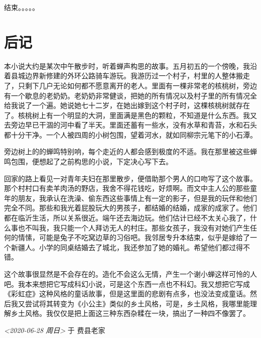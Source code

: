 \documentclass[lang=cn]{elegantpaper}
\begin{document}
结束。。。。。


\section{后记}
\label{sec:orgeed4a2e}

本小说大约是某次中午散步时，听着蝉声构思的故事。五月初五的一个傍晚，我沿着县城边界新修建的外环公路骑车游玩。我游历过一个村子，村里的人整体搬走了，只剩下几户无论如何都不愿意离开的老人。里面有一棵非常老的核桃树，旁边有一个歇息的老奶奶。老奶奶非常健谈，把她的所有情况以及村子里的所有情况全给我说了一个遍。她说她七十二岁，在她出嫁到这个村子时，这棵核桃树就存在了。核桃树上有一个明显的大洞，里面满是黑色的颗粒，不知道是什么东西。我又去旁边早已干涸的河中看了半天。里面还蓄有一些水，没有水草和青苔，水和石头都十分干净。一个人被四周的小树包围，望着河水，就如同柳宗元笔下的小石潭。

旁边树上的的蝉鸣特别响，每个走近的人都会感到极度的不适。我在那里被这些蝉鸣包围，便想起了之前构思的小说，下定决心写下去。

回家的路上看见一对青年夫妇在那里散步，便借助那个男人的口吻写了这个故事。那个村村口有卖羊肉汤的野店，我舍不得花钱吃，好烦啊。而文中主人公的那些童年的朋友，我承认在洗澡、偷东西这些事情上有一定的影子，但是我的玩伴和他们完全不同。那些和我光着屁股玩大的男孩子，都结婚的结婚，成家的成家了。他们都在临沂生活，所以关系很近。端午还去海边玩。他们估计已经不太关心我了，什么事也不叫我，我只能一个人拜访无人的村庄。那些女孩子，我没有对她们产生任何的情愫，可能是兔子不吃窝边草的习俗吧。我邻居专升本结束，似乎是嫁给了一个新疆人。小学的同桌结婚去了城北，我还参加了她的婚礼。希望他们都过得不错。

这个故事很显然是不会存在的。造化不会这么无情，产生一个谢小蝉这样可怜的人吧。我本来想把它写成科幻小说，可是这个东西一点也不科幻。我又想把它写成《彩虹症》这种风格的童话故事，但是这里面的悲剧有点多，也没法变成童话。然后我又尝试将其转变为《小公主》类似的乡土风格，可是，乡土风格，我哪里能理解乡土风格。我仅仅是把上面这三种东西杂糅在一块，搞出了一种四不像罢了。


\textit{<2020-06-28 周日>}
于 费县老家
\end{document}
